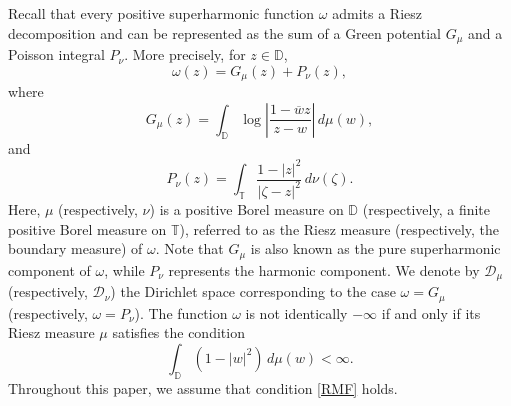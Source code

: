 \documentclass[12pt,reqno,a4paper]{amsart}
\newcommand{\cD}{{\mathcal{D}}}
\numberwithin{equation}{section}
\begin{document}
Recall that every positive superharmonic function $\omega$ admits a Riesz decomposition and can be represented as the sum of a Green potential $G_{\mu}$ and a Poisson integral $P_{\nu}$. More precisely, for $z\in \mathbb{D}$,
\[
\omega(z) = G_{\mu}(z) + P_{\nu}(z),
\]
where
\[
G_{\mu}(z) = \int_{\mathbb{D}} \log \left| \frac{1 - \overline{w} z}{z - w} \right| \, d\mu(w),
\]
and
\[
P_{\nu}(z) = \int_{\mathbb{T}} \frac{1 - |z|^2}{|\zeta - z|^2} \, d\nu(\zeta).
\]
%
Here, \(\mu\) (respectively, \(\nu\)) is a positive Borel measure on \(\mathbb{D}\) (respectively, a finite positive Borel measure on \(\mathbb{T}\)), referred to as the Riesz measure (respectively, the boundary measure) of \(\omega\). Note that \(G_\mu\) is also known as the pure superharmonic component of \(\omega\), while \(P_\nu\) represents the harmonic component. We denote by $\cD_\mu$ (respectively, $\cD_\nu$) the Dirichlet space corresponding to the case $\omega = G_\mu$ (respectively, $\omega = P_\nu$).
The function \(\omega\) is not identically \(-\infty\) if and only if its Riesz measure \(\mu\) satisfies the condition
\begin{equation} \label{RMF}
	\int_{\mathbb{D}} (1 - |w|^2) \, d\mu(w) < \infty.
\end{equation}	Throughout this paper, we assume that condition \eqref{RMF} holds. \\



\end{document}
